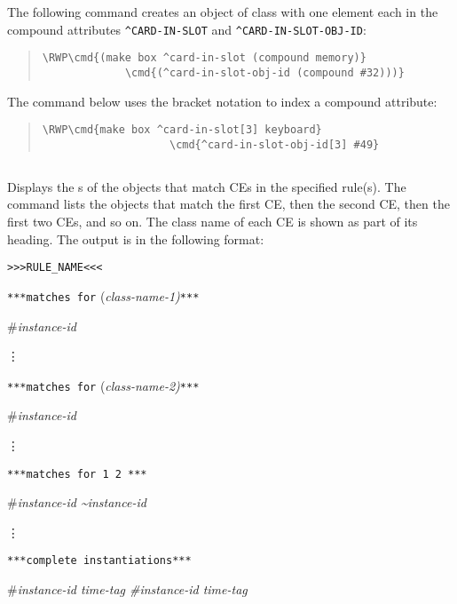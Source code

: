 The following  command creates an object of class 
with one element each in the compound attributes \verb|^CARD-IN-SLOT|
and \verb|^CARD-IN-SLOT-OBJ-ID|:

\begin{quote}
\begin{Verbatim}[commandchars=\\\{\}]
\RWP\cmd{(make box ^card-in-slot (compound memory)}
             \cmd{(^card-in-slot-obj-id (compound #32)))}
\end{Verbatim}
\end{quote}

The  command below uses the bracket notation to index a
compound attribute:

\begin{quote}
\begin{Verbatim}[commandchars=\\\{\}]
\RWP\cmd{make box ^card-in-slot[3] keyboard}
                    \cmd{^card-in-slot-obj-id[3] #49}
\end{Verbatim}
\end{quote}

\subsection{}

Displays the s of the objects that match CEs in
the specified rule(s). The command lists the objects that
match the first CE, then the second CE, then the first two
CEs, and so on. The class name of each CE is shown as part of
its heading. The output is in the following format:

\verb|>>>RULE_NAME<<<|

\verb|***matches for| \co(\it{class-name-1}\co)\verb|***|

\co\#\it{instance-id}

\vdots

\verb|***matches for| \co(\it{class-name-2}\co)\verb|***|

\co\#\it{instance-id}

\vdots

\verb|***matches for 1 2 ***|

\co\#\it{instance-id} \co\textasciitilde\it{instance-id}

\vdots

\verb|***complete instantiations***|

\co\#\it{instance-id} \it{time-tag} \co\#\it{instance-id} \it{time-tag}


